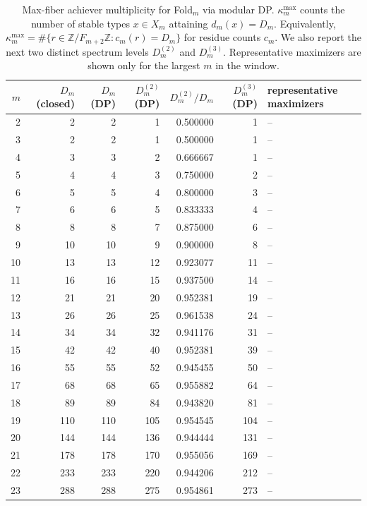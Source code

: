 \begin{table}[H]
\centering
\scriptsize
\setlength{\tabcolsep}{6pt}
\caption{Max-fiber achiever multiplicity for Fold$_m$ via modular DP. $\kappa_m^{\mathrm{max}}$ counts the number of stable types $x\in X_m$ attaining $d_m(x)=D_m$. Equivalently, $\kappa_m^{\mathrm{max}}=\#\{r\in\mathbb{Z}/F_{m+2}\mathbb{Z}: c_m(r)=D_m\}$ for residue counts $c_m$. We also report the next two distinct spectrum levels $D_m^{(2)}$ and $D_m^{(3)}$. Representative maximizers are shown only for the largest $m$ in the window.}
\label{tab:fold_max_fiber_achievers_phase}
\begin{tabular}{r r r r r r l}
\toprule
$m$ & $D_m$ (closed) & $D_m$ (DP) & $D_m^{(2)}$ (DP) & $D_m^{(2)}/D_m$ & $D_m^{(3)}$ (DP) & representative maximizers\\
\midrule
2 & 2 & 2 & 1 & 0.500000 & 1 & --\\
3 & 2 & 2 & 1 & 0.500000 & 1 & --\\
4 & 3 & 3 & 2 & 0.666667 & 1 & --\\
5 & 4 & 4 & 3 & 0.750000 & 2 & --\\
6 & 5 & 5 & 4 & 0.800000 & 3 & --\\
7 & 6 & 6 & 5 & 0.833333 & 4 & --\\
8 & 8 & 8 & 7 & 0.875000 & 6 & --\\
9 & 10 & 10 & 9 & 0.900000 & 8 & --\\
10 & 13 & 13 & 12 & 0.923077 & 11 & --\\
11 & 16 & 16 & 15 & 0.937500 & 14 & --\\
12 & 21 & 21 & 20 & 0.952381 & 19 & --\\
13 & 26 & 26 & 25 & 0.961538 & 24 & --\\
14 & 34 & 34 & 32 & 0.941176 & 31 & --\\
15 & 42 & 42 & 40 & 0.952381 & 39 & --\\
16 & 55 & 55 & 52 & 0.945455 & 50 & --\\
17 & 68 & 68 & 65 & 0.955882 & 64 & --\\
18 & 89 & 89 & 84 & 0.943820 & 81 & --\\
19 & 110 & 110 & 105 & 0.954545 & 104 & --\\
20 & 144 & 144 & 136 & 0.944444 & 131 & --\\
21 & 178 & 178 & 170 & 0.955056 & 169 & --\\
22 & 233 & 233 & 220 & 0.944206 & 212 & --\\
23 & 288 & 288 & 275 & 0.954861 & 273 & --\\

\end{tabular}
\end{table}

